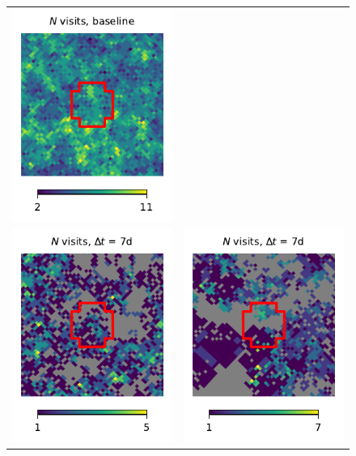 \documentclass[preprintm,linenumbers]{aastex631}
\begin{document}
\begin{figure}
\begin{tabular}{@{}c@{}c@{}}
				\includegraphics{results/skymaps_cutout/skymaps_cutout_first_year_one_snap_v4_0_10yrs_db_noDD_noTwi_nside-256_CountMetric_g_WFD_noDD_noTwi.pdf} \\
				\includegraphics{results/skymaps_cutout/skymaps_cutout_first_year_one_snap_v4_0_10yrs_db_noDD_noTwi_tscale-7_nside-256_doAllTemplateMetrics_reduceCount_g_NES_noDD_noTwi.pdf} &
				\includegraphics{results/skymaps_cutout/skymaps_cutout_first_year_one_snap_v4_0_10yrs_db_noDD_noTwi_tscale-7_nside-256_doAllTemplateMetrics_reduceCount_g_WFD_noDD_noTwi.pdf} \\

\end{tabular}
\end{figure}
\end{document}
